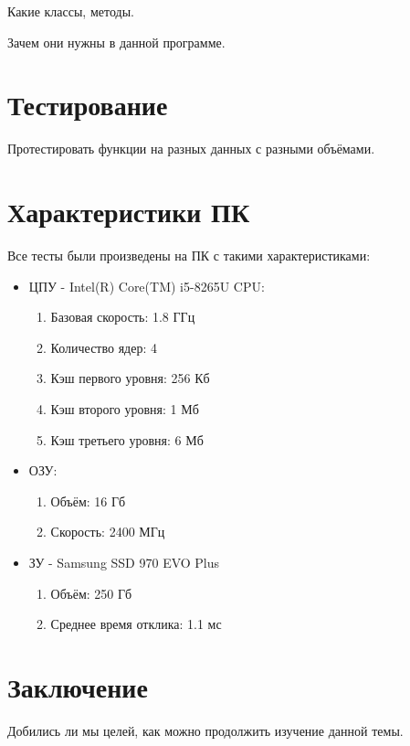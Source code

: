 Какие классы, методы.

Зачем они нужны в данной программе.

\newpage
\section{Тестирование}

Протестировать функции на разных данных с разными объёмами.

\newpage
\section{Характеристики ПК}

Все тесты были произведены на ПК с такими характеристиками:

\begin{itemize}
	\item ЦПУ - Intel(R) Core(TM) i5-8265U CPU:
	\begin{enumerate}
		\item Базовая скорость: 1.8 ГГц
		\item Количество ядер: 4
		\item Кэш первого уровня: 256 Кб
		\item Кэш второго уровня: 1 Мб
		\item Кэш третьего уровня: 6 Мб
	\end{enumerate}
	\item ОЗУ:
	\begin{enumerate}
		\item Объём: 16 Гб
		\item Скорость: 2400 МГц
	\end{enumerate}
	\item ЗУ - Samsung SSD 970 EVO Plus
	\begin{enumerate}
		\item Объём: 250 Гб
		\item Среднее время отклика: 1.1 мс
	\end{enumerate}
\end{itemize}

\newpage
\section*{Заключение}
Добились ли мы целей, как можно продолжить изучение данной темы.
